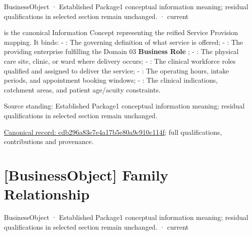\label{element:cdb296a83e7e4a17b5e80a9c910c114f}
{\small BusinessObject · Established Package1 conceptual information meaning; residual qualifications in selected section remain unchanged. · current}\par

\texttt{} is the canonical Information Concept representing the reified Service Provision mapping. It binds:
- \textbf{\texttt{}}: The governing definition of what service is offered;
- \textbf{\texttt{}}: The providing enterprise fulfilling the Domain 03 \textbf{Business Role} \texttt{};
- \textbf{\texttt{}}: The physical care site, clinic, or ward where delivery occurs;
- \textbf{\texttt{}}: The clinical workforce roles qualified and assigned to deliver the service;
- \textbf{\texttt{}}: The operating hours, intake periods, and appointment booking windows;
- \textbf{\texttt{}}: The clinical indications, catchment areas, and patient age/acuity constraints.



Source standing: Established Package1 conceptual information meaning; residual qualifications in selected section remain unchanged.


{\footnotesize \href{../../../../continuum/business/business-object/cdb296a83e7e4a17b5e80a9c910c114f.md}{Canonical record: cdb296a83e7e4a17b5e80a9c910c114f}; full qualifications, contributions and provenance.}\par
\section{[BusinessObject] Family Relationship}

\label{element:8adbce49ffdd46a19e95cf40f2aa36fd}
{\small BusinessObject · Established Package1 conceptual information meaning; residual qualifications in selected section remain unchanged. · current}\par

